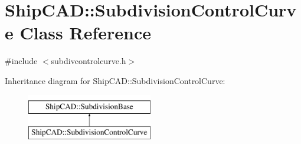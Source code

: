 \hypertarget{classShipCAD_1_1SubdivisionControlCurve}{\section{Ship\-C\-A\-D\-:\-:Subdivision\-Control\-Curve Class Reference}
\label{classShipCAD_1_1SubdivisionControlCurve}
}


{\ttfamily \#include $<$subdivcontrolcurve.\-h$>$}

Inheritance diagram for Ship\-C\-A\-D\-:\-:Subdivision\-Control\-Curve\-:\begin{figure}[H]
\begin{center}
\leavevmode
\includegraphics[height=2.000000cm]{classShipCAD_1_1SubdivisionControlCurve}
\end{center}
\end{figure}
